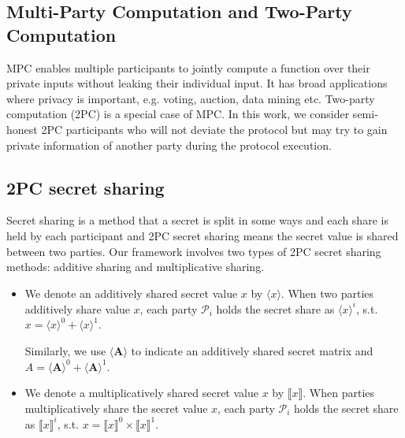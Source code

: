 \documentclass[letterpaper]{article} %
\begin{document}
    \subsection{Multi-Party Computation and Two-Party Computation}

		MPC enables multiple participants to jointly compute a function over their private inputs without leaking
		their individual input. It has broad applications where privacy is important, e.g. voting, auction,
		data mining etc. Two-party computation (2PC) is a special case of MPC.
    In this work, we consider semi-honest 2PC participants
    who will not deviate the protocol but may try to gain private information of another party
		during the protocol execution.


    \subsection{2PC secret sharing}
    Secret sharing is a method that a secret is split in some ways and each share is held by each participant
    and 2PC secret sharing means the secret value is shared between two parties.
    Our framework involves two types of 2PC secret sharing methods:
    additive sharing and multiplicative sharing.

    \begin{itemize}
        \item
        We denote an additively shared secret value $x$ by $\langle x\rangle $.
        When two parties additively share value $x$,
        each party $\mathcal{P}_{i}$ holds the secret share as $\langle x\rangle ^{i}$, s.t.
        $x=\langle x\rangle ^{0}+\langle x\rangle ^{1}$.

        Similarly, we use $\langle \mathbf{A}\rangle $ to indicate an additively shared secret matrix
        and $A =\langle \mathbf{A}\rangle ^{0}+\langle \mathbf{A}\rangle ^{1}$.

        \item We denote a multiplicatively shared secret value $x$ by $\llbracket x \rrbracket$.
        When parties multiplicatively share the secret value $x$,
        each party $\mathcal{P}_{i}$ holds the secret share as $\llbracket x \rrbracket ^{i}$, s.t.
        $x=\llbracket x \rrbracket ^{0}\times \llbracket x \rrbracket ^{1}$.

    \end{itemize}
\end{document}
